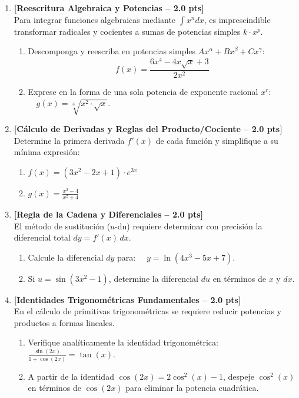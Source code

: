 \documentclass[10pt,a4paper]{article}
\begin{document}
\begin{enumerate}[leftmargin=*,itemsep=5pt,topsep=1pt,label=\textbf{\arabic*.}]

    \item \textbf{[Reescritura Algebraica y Potencias -- 2.0 pts]} \\
    Para integrar funciones algebraicas mediante $\int x^n dx$, es imprescindible transformar radicales y cocientes a sumas de potencias simples $k \cdot x^p$.
    \begin{enumerate}[label=\alph*),itemsep=1pt,topsep=1pt]
        \item Descomponga y reescriba en potencias simples $A x^{\alpha} + B x^{\beta} + C x^{\gamma}$:
        \[
        f(x) = \frac{6x^4 - 4x\sqrt{x} + 3}{2x^2}
        \]
        \item Exprese en la forma de una sola potencia de exponente racional $x^r$: $\quad g(x) = \sqrt[3]{x^2 \cdot \sqrt{x}}$.
    \end{enumerate}

    \item \textbf{[Cálculo de Derivadas y Reglas del Producto/Cociente -- 2.0 pts]} \\
    Determine la primera derivada $f'(x)$ de cada función y simplifique a su mínima expresión:
    \begin{enumerate}[label=\alph*),itemsep=1pt,topsep=1pt]
        \item $f(x) = (3x^2 - 2x + 1) \cdot e^{3x}$
        \item $\displaystyle g(x) = \frac{x^2 - 4}{x^2 + 4}$
    \end{enumerate}

    \item \textbf{[Regla de la Cadena y Diferenciales -- 2.0 pts]} \\
    El método de sustitución ($u$-du) requiere determinar con precisión la diferencial total $dy = f'(x)\,dx$.
    \begin{enumerate}[label=\alph*),itemsep=1pt,topsep=1pt]
        \item Calcule la diferencial $dy$ para: $\quad y = \ln\left(4x^3 - 5x + 7\right)$.
        \item Si $u = \sin(3x^2 - 1)$, determine la diferencial $du$ en términos de $x$ y $dx$.
    \end{enumerate}

    \item \textbf{[Identidades Trigonométricas Fundamentales -- 2.0 pts]} \\
    En el cálculo de primitivas trigonométricas se requiere reducir potencias y productos a formas lineales.
    \begin{enumerate}[label=\alph*),itemsep=1pt,topsep=1pt]
        \item Verifique analíticamente la identidad trigonométrica: $\displaystyle \frac{\sin(2x)}{1 + \cos(2x)} = \tan(x)$.
        \item A partir de la identidad $\cos(2x) = 2\cos^2(x) - 1$, despeje $\cos^2(x)$ en términos de $\cos(2x)$ para eliminar la potencia cuadrática.
    \end{enumerate}


\end{enumerate}
\end{document}
